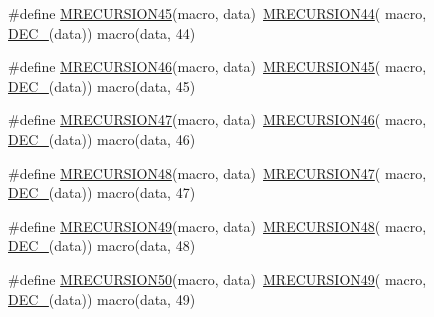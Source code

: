 \begin{DoxyCompactItemize}
\item 
\#define \mbox{\hyperlink{group__group__sam0__utils__mrecursion_ga6c44b77fa83c21cc22ccaf63ccf61ce9}{M\+R\+E\+C\+U\+R\+S\+I\+O\+N45}}(macro,  data)~\mbox{\hyperlink{group__group__sam0__utils__mrecursion_gaf2833cdb0675c88cbd9f2ba45d2f7f44}{M\+R\+E\+C\+U\+R\+S\+I\+O\+N44}}(  macro, \mbox{\hyperlink{group__group__sam0__utils__mrecursion_ga1d23d683797679dca8c3512a54a5dcae}{D\+E\+C\+\_\+}}(data))   macro(data, 44)
\item 
\#define \mbox{\hyperlink{group__group__sam0__utils__mrecursion_ga15da6fe5b481385cb81447562e307e67}{M\+R\+E\+C\+U\+R\+S\+I\+O\+N46}}(macro,  data)~\mbox{\hyperlink{group__group__sam0__utils__mrecursion_ga6c44b77fa83c21cc22ccaf63ccf61ce9}{M\+R\+E\+C\+U\+R\+S\+I\+O\+N45}}(  macro, \mbox{\hyperlink{group__group__sam0__utils__mrecursion_ga1d23d683797679dca8c3512a54a5dcae}{D\+E\+C\+\_\+}}(data))   macro(data, 45)
\item 
\#define \mbox{\hyperlink{group__group__sam0__utils__mrecursion_ga5a7b09aafde0d0218dd81631ea9b8063}{M\+R\+E\+C\+U\+R\+S\+I\+O\+N47}}(macro,  data)~\mbox{\hyperlink{group__group__sam0__utils__mrecursion_ga15da6fe5b481385cb81447562e307e67}{M\+R\+E\+C\+U\+R\+S\+I\+O\+N46}}(  macro, \mbox{\hyperlink{group__group__sam0__utils__mrecursion_ga1d23d683797679dca8c3512a54a5dcae}{D\+E\+C\+\_\+}}(data))   macro(data, 46)
\item 
\#define \mbox{\hyperlink{group__group__sam0__utils__mrecursion_gaf338c8087c63ca31cb23b9502cf53a81}{M\+R\+E\+C\+U\+R\+S\+I\+O\+N48}}(macro,  data)~\mbox{\hyperlink{group__group__sam0__utils__mrecursion_ga5a7b09aafde0d0218dd81631ea9b8063}{M\+R\+E\+C\+U\+R\+S\+I\+O\+N47}}(  macro, \mbox{\hyperlink{group__group__sam0__utils__mrecursion_ga1d23d683797679dca8c3512a54a5dcae}{D\+E\+C\+\_\+}}(data))   macro(data, 47)
\item 
\#define \mbox{\hyperlink{group__group__sam0__utils__mrecursion_ga6b1985491fecb7655f97651ce16eb3c0}{M\+R\+E\+C\+U\+R\+S\+I\+O\+N49}}(macro,  data)~\mbox{\hyperlink{group__group__sam0__utils__mrecursion_gaf338c8087c63ca31cb23b9502cf53a81}{M\+R\+E\+C\+U\+R\+S\+I\+O\+N48}}(  macro, \mbox{\hyperlink{group__group__sam0__utils__mrecursion_ga1d23d683797679dca8c3512a54a5dcae}{D\+E\+C\+\_\+}}(data))   macro(data, 48)
\item 
\#define \mbox{\hyperlink{group__group__sam0__utils__mrecursion_gadda406cbee1fde1ebddb8671c858981c}{M\+R\+E\+C\+U\+R\+S\+I\+O\+N50}}(macro,  data)~\mbox{\hyperlink{group__group__sam0__utils__mrecursion_ga6b1985491fecb7655f97651ce16eb3c0}{M\+R\+E\+C\+U\+R\+S\+I\+O\+N49}}(  macro, \mbox{\hyperlink{group__group__sam0__utils__mrecursion_ga1d23d683797679dca8c3512a54a5dcae}{D\+E\+C\+\_\+}}(data))   macro(data, 49)

\end{DoxyCompactItemize}

